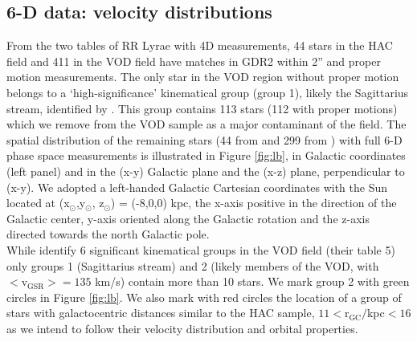 \documentclass[fleqn,usenatbib]{mnras}
\begin{document}
\subsection{6-D data: velocity distributions}
From the two tables of RR Lyrae with 4D measurements, 44 stars in the HAC field and 411 in the VOD field have matches in GDR2 within 2'' and proper motion measurements. The only star in the VOD region without proper motion belongs to a `high-significance' kinematical group (group 1), likely the Sagittarius stream, identified by \cite{Vivas2016}. This group contains 113 stars (112 with proper motions)  which we remove from the VOD sample as a major contaminant of the field. The spatial distribution of the remaining stars (44 from \citealt{Simion2018} and 299 from \citealt{Vivas2016}) with full 6-D phase space measurements is illustrated in Figure \ref{fig:lb}, in Galactic coordinates (left panel) and in the (x-y) Galactic plane and the (x-z) plane, perpendicular to (x-y). We adopted a left-handed Galactic Cartesian coordinates with the Sun located at (x$_{\odot}$,y$_{\odot}$, z$_{\odot}$) = (-8,0,0) kpc, the x-axis positive in the direction of the Galactic center, y-axis oriented along the Galactic rotation and the z-axis directed towards the north Galactic pole.\\
While \citealt{Vivas2016} identify 6 significant kinematical groups in the VOD field (their table 5) only groups 1 (Sagittarius stream) and 2 (likely members of the VOD, with $\mathrm{<v_{GSR}>}= 135$ km/s) contain more than 10 stars. We mark group 2 with green circles in Figure \ref{fig:lb}. We also mark with red circles the location of a group of stars with galactocentric distances similar to the HAC sample, $11\mathrm{<r_{GC}}/$kpc$<16$ as we intend to follow their velocity distribution and orbital properties.\\
%
%
%
%
\end{document}
